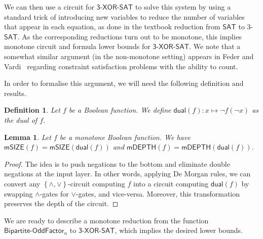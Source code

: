 \documentclass[10pt,a4paper]{article}
\newtheorem{lemma}[theorem]{Lemma}
\newtheorem{definition}[theorem]{Definition}
\newcommand{\txorsat}{\mathsf{3\mbox{-}XOR\mbox{-}SAT}}
\newcommand{\Cmon}[1]{\mathsf{mSIZE}({#1})}
\newcommand{\mdepth}[1]{\mathsf{mDEPTH}({#1})}
\newcommand{\set}[1]{\left\{#1\right\}}
\newcommand{\SAT}{\mathsf{SAT}}
\newcommand{\OddFactor}{\mathsf{OddFactor}}
\newcommand{\BipOddFactor}{\mathsf{Bipartite}\text{-}\OddFactor}
\newcommand{\dual}{\mathsf{dual}}
\begin{document}
We can then use a circuit for $\txorsat$ to solve this system
by using a standard trick of introducing new variables
to reduce the number of variables that appear in each equation,
as done in the textbook reduction from $\SAT$ to 3-$\SAT$. As the corresponding reductions turn out to be monotone, this implies monotone circuit and formula lower bounds for $\txorsat$.
We note that a somewhat similar   argument (in the non-monotone setting) appears in Feder and
Vardi~\cite[Theorem 30]{DBLP:journals/siamcomp/FederV98} regarding
constraint satisfaction problems with the ability to count.

In order to formalise this argument, we will need the following definition and results.

\begin{definition}
    \label{def:dual}
    Let $f$ be a Boolean function.
    We define $\dual(f) : x \mapsto \neg f(\neg x)$
    as the \emph{dual} of $f$.
\end{definition}

\begin{lemma}
    \label{lem:dual}
    Let $f$ be a monotone Boolean function.
    We have
    $\Cmon{f} = \Cmon{\dual(f)}$
    and
    $\mdepth{f} = \mdepth{\dual(f)}$.
\end{lemma}
\begin{proof}
    The idea is to push negations to the bottom and eliminate double negations at the input layer. In other words, applying De Morgan rules, we can convert any $\set{\land,\lor}$-circuit computing
    $f$ into a circuit computing $\dual(f)$ 
    by swapping $\land$-gates for
    $\lor$-gates, and vice-versa.
    Moreover, this transformation preserves the depth of the circuit.
\end{proof}




We are ready to describe a monotone reduction from the function $\BipOddFactor_n$ 
to $\txorsat$, which implies the desired lower bounds.
\end{document}
